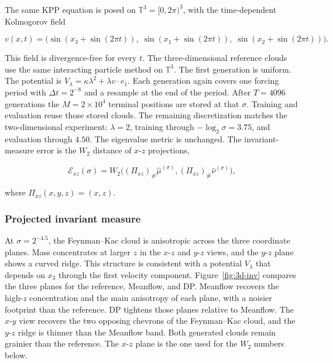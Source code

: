 \documentclass[11pt]{article}
\begin{document}
The same KPP equation is posed on \(\mathbb{T}^3=[0,2\pi)^3\), with the
time-dependent Kolmogorov field

\begin{equation}
v(x,t)=\bigl(
\sin(x_3+\sin(2\pi t)),\;
\sin(x_1+\sin(2\pi t)),\;
\sin(x_2+\sin(2\pi t))
\bigr).
\end{equation}

This field is divergence-free for every \(t\). The three-dimensional
reference clouds use the same interacting particle method on
\(\mathbb{T}^3\). The first generation is uniform. The potential is
\(V_\lambda=\kappa\lambda^2+\lambda v\cdot e_1\). Each generation again
covers one forcing period with \(\Delta t=2^{-8}\) and a resample at the
end of the period. After \(T=4096\) generations the
\(M=2\times 10^4\) terminal positions are stored at that \(\sigma\).
Training and evaluation reuse those stored clouds. The remaining
discretization matches the two-dimensional experiment: \(\lambda=2\),
training through \(-\log_2\sigma=3.75\), and evaluation through \(4.50\).
The eigenvalue metric is unchanged. The invariant-measure
error is the \(W_2\) distance of \(x\)-\(z\) projections,

\begin{equation}
\mathcal{E}_{xz}(\sigma)
=W_2\bigl((\Pi_{xz})_{\#}\hat\mu^{(\sigma)},
(\Pi_{xz})_{\#}\hat\nu^{(\sigma)}\bigr),
\end{equation}

where \(\Pi_{xz}(x,y,z)=(x,z)\).

\subsubsection{Projected invariant measure}

At \(\sigma=2^{-4.5}\), the Feynman--Kac cloud is anisotropic across the
three coordinate planes. Mass concentrates at larger \(z\) in the
\(x\)-\(z\) and \(y\)-\(z\) views, and the \(y\)-\(z\) plane shows a curved
ridge. This structure is consistent with a potential \(V_\lambda\) that
depends on \(x_3\) through the first velocity component.
Figure~\ref{fig:3d-inv} compares the three planes for the reference,
Meanflow, and DP. Meanflow recovers the high-\(z\) concentration and the
main anisotropy of each plane, with a noisier footprint than the
reference. DP tightens those planes relative to Meanflow. The \(x\)-\(y\)
view recovers the two opposing chevrons of the Feynman--Kac cloud, and
the \(y\)-\(z\) ridge is thinner than the Meanflow band. Both generated
clouds remain grainier than the reference. The \(x\)-\(z\) plane is the
one used for the \(W_2\) numbers below.
\end{document}
